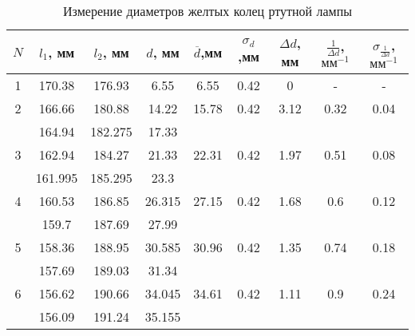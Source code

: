 \begin{table}[]
		\caption{Измерение диаметров желтых колец ртутной лампы}
			\begin{tabular}{|c|c|c|c|c|c|c|c|c|}
				\hline
					$ N $ & $ l_1 $, мм & $ l_2 $, мм & $ d $, мм & $ \overline{d} $,мм &  $ \sigma_d $,мм & $ \Delta d $, мм  &  $ \frac{1}{\Delta d} $,$ \text{мм}^{-1} $ & $ \sigma_{\frac{1}{\Delta d}} $,$ \text{мм}^{-1} $\\
					\hline
			1 & 170.38 & 176.93 & 6.55 & 6.55 & 0.42 & 0 & - & - \\
			\hline
			2 & 166.66 & 180.88 & 14.22 & 15.78 & 0.42 & 3.12 & 0.32 & 0.04 \\
			\text{} & 164.94 & 182.275 & 17.33 & \text{} & \text{} & \text{} & \text{} & \text{} \\
			\hline
			
			3 & 162.94 & 184.27 & 21.33 & 22.31 & 0.42 & 1.97 & 0.51 & 0.08 \\
			\text{} & 161.995 & 185.295 & 23.3 & \text{} & \text{} & \text{} & \text{} & \text{} \\
			\hline
			4 & 160.53 & 186.85 & 26.315 & 27.15 & 0.42 & 1.68 & 0.6 & 0.12 \\
			\text{} & 159.7 & 187.69 & 27.99 & \text{} & \text{} & \text{} & \text{} & \text{} \\
			\hline
			5 & 158.36 & 188.95 & 30.585 & 30.96 & 0.42 & 1.35 & 0.74 & 0.18 \\
			\text{} & 157.69 & 189.03 & 31.34 & \text{} & \text{} & \text{} & \text{} & \text{} \\
			\hline
			6 & 156.62 & 190.66 & 34.045 & 34.61 & 0.42 & 1.11 & 0.9 & 0.24 \\
			\text{} & 156.09 & 191.24 & 35.155 & \text{} & \text{} & \text{} & \text{} & \text{} \\
				\hline
			\end{tabular}
		\label{Ye_table}
\end{table}